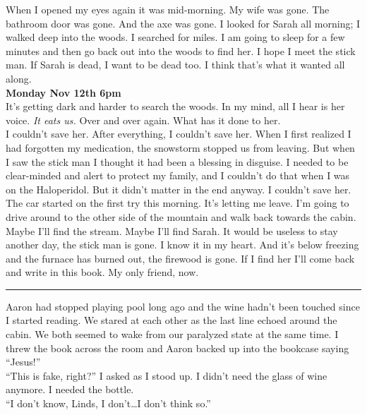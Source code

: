 \documentclass[a5paper]{scrartcl}
\begin{document}
When I opened my eyes again it was mid-morning. My wife was gone. The bathroom door was gone. And the axe was gone. I looked for Sarah all morning; I walked deep into the woods. I searched for miles. I am going to sleep for a few minutes and then go back out into the woods to find her. I hope I meet the stick man. If Sarah is dead, I want to be dead too. I think that's what it wanted all along. \\


\textbf{Monday Nov 12th 6pm}
\\


It's getting dark and harder to search the woods. In my mind, all I hear is her voice. \textit{It eats us.}
 Over and over again. What has it done to her. \\


I couldn't save her. After everything, I couldn't save her. When I first realized I had forgotten my medication, the snowstorm stopped us from leaving. But when I saw the stick man I thought it had been a blessing in disguise. I needed to be clear-minded and alert to protect my family, and I couldn't do that when I was on the Haloperidol.  But it didn't matter in the end anyway. I couldn't save her.\\


The car started on the first try this morning. It's letting me leave.  I'm going to drive around to the other side of the mountain and walk back towards the cabin. Maybe I'll find the stream. Maybe I'll find Sarah. It would be useless to stay another day, the stick man is gone. I know it in my heart. And it's below freezing and the furnace has burned out, the firewood is gone. If I find her I'll come back and write in this book. My only friend, now.\\

\hrule

Aaron had stopped playing pool long ago and the wine hadn't been touched since I started reading. We stared at each other as the last line echoed around the cabin. We both seemed to wake from our paralyzed state at the same time. I threw the book across the room and Aaron backed up into the bookcase saying \enquote{Jesus!}\\


\enquote{This is fake, right?} I asked as I stood up. I didn't need the glass of wine anymore. I needed the bottle.\\


\enquote{I don't know, Linds, I don't\dots I don't think so.} \\
\end{document}
